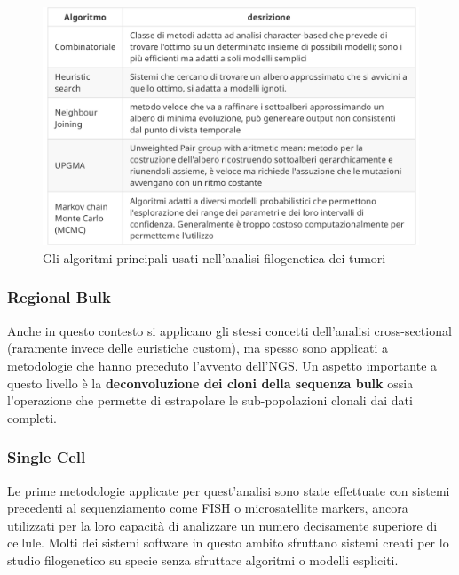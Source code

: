 \documentclass[a4paper]{article}
\begin{document}
	\begin{figure}[h]
	  \centering
	  \includegraphics[scale=0.3, keepaspectratio]{TabAlgoritmi.png}%
	  \captionsetup{justification=centering,margin=0.5cm}
	  \caption{Gli algoritmi principali usati nell'analisi filogenetica dei tumori} \label{fig:TabAlgoritmi}
	\end{figure}

	\subsubsection{Regional Bulk} 
	
	Anche in questo contesto si applicano gli stessi concetti dell'analisi cross-sectional (raramente invece delle euristiche custom), ma spesso sono applicati a metodologie 
	che hanno preceduto l'avvento dell'NGS. Un aspetto importante a questo livello è la \textbf{deconvoluzione dei cloni della sequenza bulk} ossia l'operazione che permette 
	di estrapolare le sub-popolazioni clonali dai dati completi.

	\subsubsection{Single Cell}

	Le prime metodologie applicate per quest'analisi sono state effettuate con sistemi precedenti al
	sequenziamento come FISH o microsatellite markers, ancora utilizzati per la loro capacità di analizzare un
	numero decisamente superiore di cellule. Molti dei sistemi software in questo ambito sfruttano
	sistemi creati per lo studio filogenetico su specie senza sfruttare algoritmi o modelli espliciti.

	\normalsize
\end{document}

